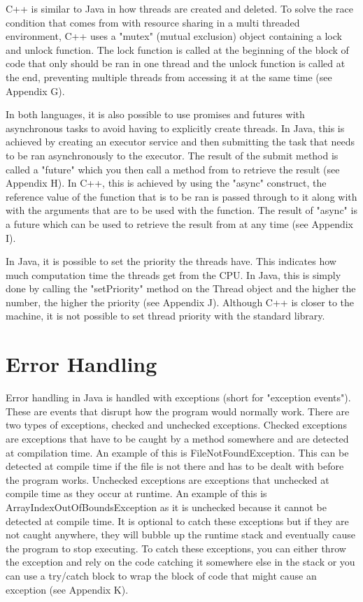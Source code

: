 \documentclass[]{report}
\begin{document}
C++ is similar to Java in how threads are created and deleted. To solve the race condition that comes from with resource sharing in a multi threaded environment, C++ uses a "mutex" (mutual exclusion) object containing a lock and unlock function. The lock function is called at the beginning of the block of code that only should be ran in one thread and the unlock function is called at the end, preventing multiple threads from accessing it at the same time (see Appendix G).\cite{ConcurrencyC++}

In both languages, it is also possible to use promises and futures with asynchronous tasks to avoid having to explicitly create threads. In Java, this is achieved by creating an executor service and then submitting the task that needs to be ran asynchronously to the executor. The result of the submit method is called a "future" which you then call a method from to retrieve the result (see Appendix H). In C++, this is achieved by using the "async" construct, the reference value of the function that is to be ran is passed through to it along with with the arguments that are to be used with the function. The result of "async" is a future which can be used to retrieve the result from at any time (see Appendix I).

In Java, it is possible to set the priority the threads have. This indicates how much computation time the threads get from the CPU. In Java, this is simply done by calling the "setPriority" method on the Thread object and the higher the number, the higher the priority (see Appendix J). Although C++ is closer to the machine, it is not possible to set thread priority with the standard library.

\section{Error Handling}
Error handling in Java is handled with exceptions (short for "exception events"). These are events that disrupt how the program would normally work. There are two types of exceptions, checked and unchecked exceptions. Checked exceptions are exceptions that have to be caught by a method somewhere and are detected at compilation time. An example of this is FileNotFoundException. This can be detected at compile time if the file is not there and has to be dealt with before the program works. Unchecked exceptions are exceptions that unchecked at compile time as they occur at runtime. An example of this is ArrayIndexOutOfBoundsException as it is unchecked because it cannot be detected at compile time. It is optional to catch these exceptions but if they are not caught anywhere, they will bubble up the runtime stack and eventually cause the program to stop executing. To catch these exceptions, you can either throw the exception and rely on the code catching it somewhere else in the stack or you can use a try/catch block to wrap the block of code that might cause an exception (see Appendix K).\cite{ExceptionsJava}
\end{document}
